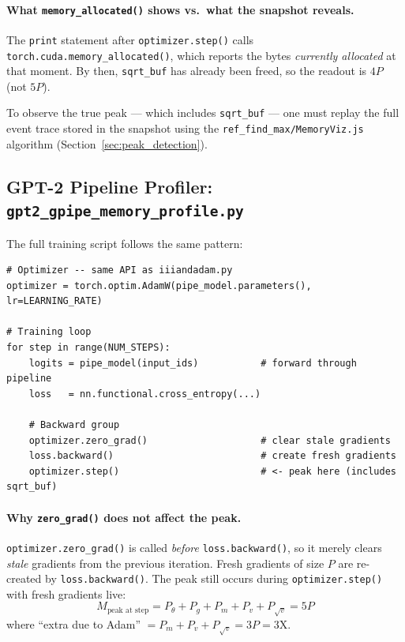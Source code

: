 \documentclass[11pt,a4paper]{article}
\begin{document}
\paragraph{What \texttt{memory\_allocated()} shows vs.\ what the snapshot reveals.}
The \texttt{print} statement after \texttt{optimizer.step()} calls
\texttt{torch.cuda.memory\_allocated()}, which reports the bytes
\emph{currently allocated} at that moment.  By then, \texttt{sqrt\_buf}
has already been freed, so the readout is $4P$ (not $5P$).

To observe the true peak --- which includes \texttt{sqrt\_buf} --- one
must replay the full event trace stored in the snapshot using the
\texttt{ref\_find\_max/MemoryViz.js} algorithm
(Section~\ref{sec:peak_detection}).

\subsection{GPT-2 Pipeline Profiler: \texttt{gpt2\_gpipe\_memory\_profile.py}}
\label{sec:gpt2}

The full training script follows the same pattern:

\begin{lstlisting}[caption={AdamW usage in \texttt{gpt2\_gpipe\_memory\_profile.py} (abridged).},firstnumber=296]
# Optimizer -- same API as iiiandadam.py
optimizer = torch.optim.AdamW(pipe_model.parameters(), lr=LEARNING_RATE)

# Training loop
for step in range(NUM_STEPS):
    logits = pipe_model(input_ids)           # forward through pipeline
    loss   = nn.functional.cross_entropy(...)

    # Backward group
    optimizer.zero_grad()                    # clear stale gradients
    loss.backward()                          # create fresh gradients
    optimizer.step()                         # <- peak here (includes sqrt_buf)
\end{lstlisting}

\paragraph{Why \texttt{zero\_grad()} does not affect the peak.}
\texttt{optimizer.zero\_grad()} is called \emph{before} \texttt{loss.backward()},
so it merely clears \emph{stale} gradients from the previous iteration.
Fresh gradients of size $P$ are re-created by \texttt{loss.backward()}.
The peak still occurs during \texttt{optimizer.step()} with fresh gradients
live:
\begin{equation}
  M_{\text{peak at step}} = P_\theta + P_g + P_{m} + P_{v} + P_{\sqrt{v}}
  = 5P
  \label{eq:5p}
\end{equation}
where ``extra due to Adam'' $= P_m + P_v + P_{\sqrt{v}} = 3P = 3\mathrm{X}$.
\end{document}

